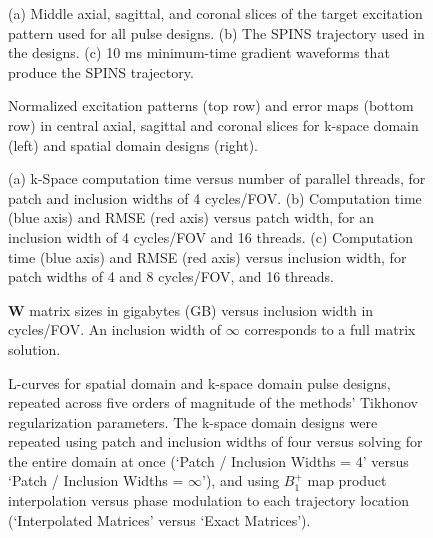 \documentclass[11pt]{article}
\renewcommand{\textcolor}[1]{}
\begin{document}
\begin{figure}
	\centering
	\caption{(a) Middle axial, sagittal, and coronal slices of the target excitation pattern used for all pulse designs. 
	(b) The SPINS trajectory used in the designs. 
	(c) 10 ms minimum-time gradient waveforms that produce the SPINS trajectory.}
	\label{fig:Target}
\end{figure}

\begin{figure}
	\centering
	\caption{ %
	Normalized excitation patterns (top row) and error maps (bottom row) in central axial, sagittal and coronal slices 
	for k-space domain (left) and spatial domain designs (right).}
	\label{fig:ErrorMap}
\end{figure}

\begin{figure}
	\centering
	\caption{(a) k-Space computation time versus number of parallel threads, for patch and inclusion widths of 4 cycles/FOV. 
	(b) Computation time (blue axis) and RMSE (red axis) versus patch width, for an inclusion width of 4 cycles/FOV and 16 threads. 
	(c) Computation time (blue axis) and RMSE (red axis) versus inclusion width, for patch widths of 4 and 8 cycles/FOV, and 16 threads.}
	\label{fig:ComputationTime}
\end{figure}

\begin{figure}
\centering
\caption{$\bm{W}$ matrix sizes in gigabytes (GB) versus inclusion width in cycles/FOV. 
An inclusion width of $\infty$ corresponds to a full matrix solution.}
\label{fig:wsize}
\end{figure}

\begin{figure}
	\centering
	\caption{L-curves for spatial domain and k-space domain pulse designs, 
	repeated across five orders of magnitude of the methods' Tikhonov regularization parameters.
	The k-space domain designs were repeated using patch and inclusion widths of four versus solving for the entire domain at once (`Patch / Inclusion Widths = 4' versus `Patch / Inclusion Widths = $\infty$'),
	and using $B_1^+$ map product interpolation versus phase modulation to each trajectory location (`Interpolated Matrices' versus
	`Exact Matrices').}
	\label{fig:LCurves}
\end{figure}
\end{document}

